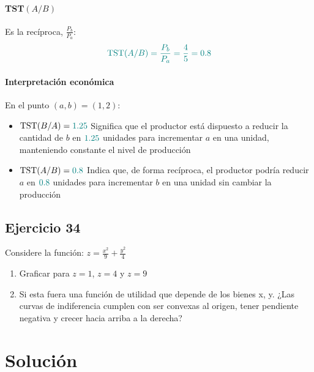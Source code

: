 \documentclass{article}
\begin{document}
\paragraph{TST\((A/B)\)}  
Es la recíproca, \(\frac{P_b}{P_a}\):
\[
\color{teal}
\mathrm{TST}(A/B)
= \frac{P_b}{P_a}
= \frac{4}{5}
= 0.8
\]

\paragraph{Interpretación económica}

En el punto \( (a,b) = (1,2) \):

\begin{itemize}
  \item \(\displaystyle \mathrm{TST}(B/A) = \color{teal} 1.25\)  
    Significa que el productor está dispuesto a reducir la cantidad de \(b\) en \(\color{teal} 1.25\) unidades para incrementar \(a\) en una unidad, manteniendo constante el nivel de producción

  \item \(\displaystyle \mathrm{TST}(A/B) = \color{teal} 0.8\)  
    Indica que, de forma recíproca, el productor podría reducir \(a\) en \(\color{teal} 0.8\) unidades para incrementar \(b\) en una unidad sin cambiar la producción
\end{itemize}

\newpage

\subsection{Ejercicio 34}
Considere la función: $z = \frac{x^2}{9} + \frac{y^2}{4}$

\begin{enumerate}
    \item Graficar para $z=1$, $z=4$ y $z=9$
    \item Si esta fuera una función de utilidad que depende de los bienes x, y. ¿Las curvas de indiferencia cumplen con ser convexas al origen, tener pendiente negativa y crecer hacia arriba a la derecha?
\end{enumerate}


\newpage
\section*{Solución}
\end{document}
